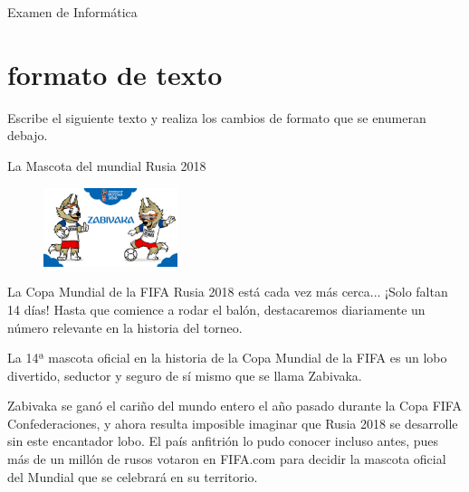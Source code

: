 \documentclass[12pt,spanish]{article}
\begin{document}
\begin{center}

\vspace{0.2in}

\vspace{0.2in}

\vspace{0.2in}

    {\huge Examen de Informática}
\end{center}

\section{formato de texto}
    Escribe el siguiente texto y realiza los cambios de formato que se enumeran debajo.
    
    \begin{center}
      \centering
      La Mascota del mundial Rusia 2018
    \end{center}
   
    \begin{figure}
        \includegraphics[width=0.35\textwidth]{rusia.jpg}
    \end{figure}

    La Copa Mundial de la FIFA Rusia 2018 está cada vez más cerca... ¡Solo faltan 14 días! Hasta que comience a rodar el balón, destacaremos diariamente un número relevante en la historia del torneo.
    
    La 14ª mascota oficial en la historia de la Copa Mundial de la FIFA es un lobo divertido, seductor y seguro de sí mismo que se llama Zabivaka.

  Zabivaka se ganó el cariño del mundo entero el año pasado durante la Copa FIFA Confederaciones, y ahora resulta imposible imaginar que Rusia 2018 se desarrolle sin este encantador lobo. El país anfitrión lo pudo conocer incluso antes, pues más de un millón de rusos votaron en FIFA.com para decidir la mascota oficial del Mundial que se celebrará en su territorio.
  
\end{document}
